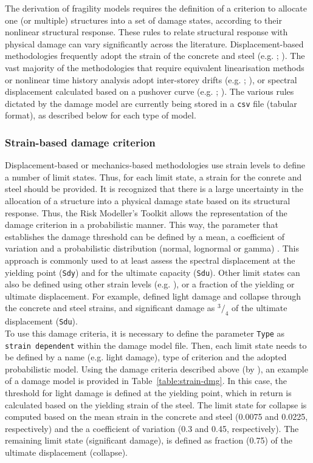 The derivation of fragility models requires the definition of a criterion to allocate one (or multiple) structures into a set of damage states, according to their nonlinear structural response. These rules to relate structural response with physical damage can vary significantly across the literature. Displacement-based methodologies frequently adopt the strain of the concrete and steel (e.g. \cite{BorziEtAl2008b}; \cite{SilvaEtAl2013}). The vast majority of the methodologies that require equivalent linearisation methods or nonlinear time history analysis adopt inter-storey drifts (e.g. \cite{VamvatsikosCornell2005}; \cite{RossettoElnashai2005}), or spectral displacement calculated based on a pushover curve (e.g. \cite{Erberik2008}; \cite{SilvaEtAl2014c}). The various rules dictated by the damage model are currently being stored in a \verb=csv= file (tabular format), as described below for each type of model.

\subsubsection{Strain-based damage criterion}
\label{subsubsec:strain-dmg}
Displacement-based \citep{CrowleyEtAl2004} or mechanics-based \citep{BorziEtAl2008b} methodologies use strain levels to define a number of limit states. Thus, for each limit state, a strain for the conrete and steel should be provided. It is recognized that there is a large uncertainty in the allocation of a structure into a physical damage state based on its structural response. Thus, the Risk Modeller's Toolkit allows the representation of the damage criterion in a probabilistic manner. This way, the parameter that establishes the damage threshold can be defined by a mean, a coefficient of variation and a probabilistic distribution (normal, lognormal or gamma) \citep{SilvaEtAl2013}. This approach is commonly used to at least assess the spectral displacement at the yielding point (\verb=Sdy=) and for the ultimate capacity (\verb=Sdu=). Other limit states can also be defined using other strain levels (e.g. \cite{CrowleyEtAl2004}), or a fraction of the yielding or ultimate displacement. For example, \cite{BorziEtAl2008b} defined light damage and collapse through the concrete and steel strains, and significant damage as $^3/_4$ of the ultimate displacement (\verb=Sdu=).\\

To use this damage criteria, it is necessary to define the parameter \verb=Type= as \verb=strain dependent= within the damage model file. Then, each limit state needs to be defined by a name (e.g. light damage), type of criterion and the adopted probabilistic model. Using the damage criteria described above (by \cite{BorziEtAl2008b}), an example of a damage model is provided in Table~\ref{table:strain-dmg}. In this case, the threshold for light damage is defined at the yielding point, which in return is calculated based on the yielding strain of the steel. The limit state for collapse is computed based on the mean strain in the concrete and steel (0.0075 and 0.0225, respectively) and the a coefficient of variation (0.3 and 0.45, respectively). The remaining limit state (significant damage), is defined as fraction (0.75) of the ultimate displacement (collapse).

